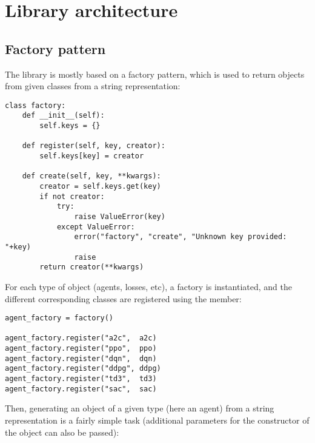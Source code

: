 \chapter{Library architecture}
\label{section:architecture}

\section{Factory pattern}
\label{section:factory}

The library is mostly based on a factory pattern, which is used to return objects from given classes from a string representation:

\begin{verbatim}
class factory:
    def __init__(self):
        self.keys = {}

    def register(self, key, creator):
        self.keys[key] = creator

    def create(self, key, **kwargs):
        creator = self.keys.get(key)
        if not creator:
            try:
                raise ValueError(key)
            except ValueError:
                error("factory", "create", "Unknown key provided: "+key)
                raise
        return creator(**kwargs)
\end{verbatim}

For each type of object (agents, losses, etc), a factory is instantiated, and the different corresponding classes are registered using the  member:

\begin{verbatim}
agent_factory = factory()

agent_factory.register("a2c",  a2c)
agent_factory.register("ppo",  ppo)
agent_factory.register("dqn",  dqn)
agent_factory.register("ddpg", ddpg)
agent_factory.register("td3",  td3)
agent_factory.register("sac",  sac)
\end{verbatim}

Then, generating an object of a given type (here an agent) from a string representation is a fairly simple task (additional parameters for the constructor of the object can also be passed):

